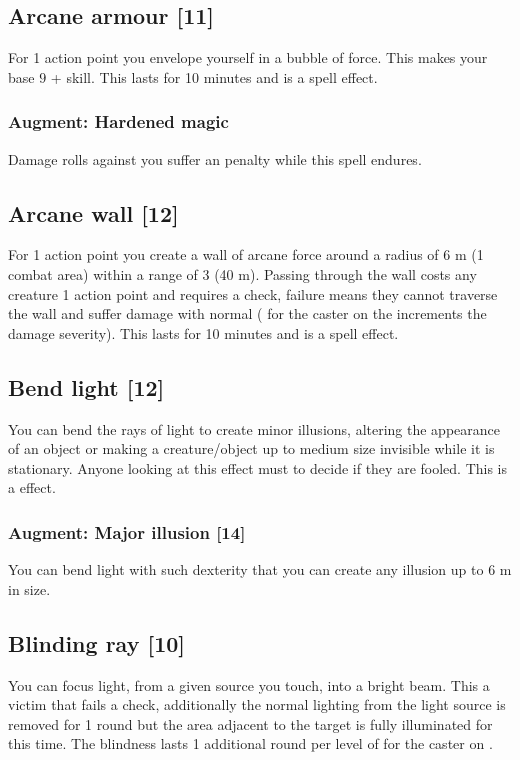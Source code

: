 \subsection{Arcane armour [11]}
\label{spell:arcane-armour}
For 1 action point you envelope yourself in a bubble of force. This makes your base  $9$ +  skill. This lasts for 10 minutes and is a  spell effect.
\subsubsection{Augment: Hardened magic}
Damage rolls against you suffer an  penalty while this spell endures.

\subsection{Arcane wall [12]}
For 1 action point you create a wall of arcane force around a radius of 6 m (1 combat area) within a range of 3 (40 m). Passing through the wall costs any creature 1 action point and requires a  check, failure means they cannot traverse the wall and suffer damage with normal  ( for the caster on the  increments the damage severity). This lasts for 10 minutes and is a  spell effect.

\subsection{Bend light [12]}
\label{spell:bend-light}
You can bend the rays of light to create minor illusions, altering the appearance of an object or making a creature/object up to medium size invisible while it is stationary. Anyone looking at this effect must  to decide if they are fooled. This is a  effect.
\subsubsection{Augment: Major illusion [14]}
You can bend light with such dexterity that you can create any illusion up to 6 m in size. 

\subsection{Blinding ray [10]}
\label{spell:blind-ray}
You can focus light, from a given source you touch, into a bright beam. This  a victim that fails a  check, additionally the normal lighting from the light source is removed for 1 round but the area adjacent to the target is fully illuminated for this time. The blindness lasts 1 additional round per level of  for the caster on .

